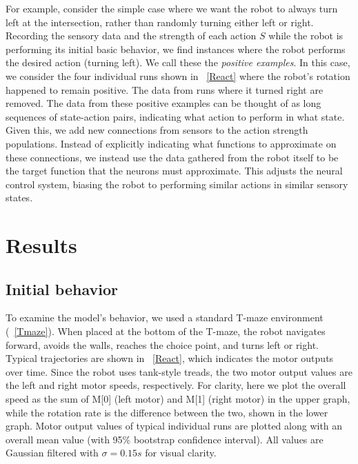 \documentclass[conference]{IEEEtran}
\begin{document}
For example, consider the simple case where we want the robot to always turn left at 
the intersection, rather than randomly turning either left or right. Recording 
the sensory data and the strength of each action $S$ while the robot is 
performing its initial basic behavior, we find instances where the robot 
performs the desired action (turning left). We call these the \textit{positive 
examples}. In this case, we consider the four individual runs shown in 
\figurename~\ref{React} where the robot's rotation happened to remain positive.  
The data from runs where it turned right are removed.  The data from these positive examples can 
be thought of as long sequences of state-action pairs, indicating what action 
to perform in what state. Given this, we add new connections from sensors to 
the action strength populations. Instead of explicitly indicating what functions 
to approximate on these connections, we instead use the data gathered from
the robot itself to be the target function that the neurons must approximate.
This adjusts the neural control system, biasing the robot to performing
similar actions in similar sensory states.

\section{Results}

\subsection{Initial behavior}

To examine the model's behavior, we used a standard T-maze
environment (\figurename~\ref{Tmaze}). When placed at the bottom
of the T-maze, the robot navigates forward, avoids the
walls, reaches the choice point, and turns left or right.
Typical trajectories are shown in \figurename~\ref{React}, which indicates
the motor outputs over time. Since the robot uses tank-style treads, the 
two motor output values are the left and right motor speeds, respectively. 
For clarity, here we plot the overall speed as the sum of M[0] (left motor) 
and M[1] (right motor) in the upper graph, while the rotation rate is the difference between the two,
shown in the lower graph. 
Motor output values of typical individual runs are plotted along with an overall 
mean value (with 95\% bootstrap confidence interval). All values are Gaussian 
filtered with $\sigma=0.15s$ for visual clarity.
\end{document}
